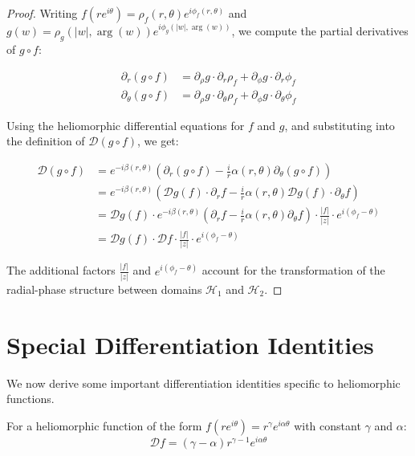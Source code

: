\begin{proof}
Writing $f(re^{i\theta}) = \rho_f(r,\theta)e^{i\phi_f(r,\theta)}$ and $g(w) = \rho_g(|w|,\arg(w))e^{i\phi_g(|w|,\arg(w))}$, we compute the partial derivatives of $g \circ f$:

\begin{align}
\partial_r(g \circ f) &= \partial_\rho g \cdot \partial_r\rho_f + \partial_\phi g \cdot \partial_r\phi_f\\
\partial_\theta(g \circ f) &= \partial_\rho g \cdot \partial_\theta\rho_f + \partial_\phi g \cdot \partial_\theta\phi_f
\end{align}

Using the heliomorphic differential equations for $f$ and $g$, and substituting into the definition of $\mathcal{D}(g \circ f)$, we get:

\begin{align}
\mathcal{D}(g \circ f) &= e^{-i\beta(r,\theta)}\left(\partial_r(g \circ f) - \frac{i}{r}\alpha(r,\theta)\partial_\theta(g \circ f)\right)\\
&= e^{-i\beta(r,\theta)}\left(\mathcal{D}g(f) \cdot \partial_rf - \frac{i}{r}\alpha(r,\theta)\mathcal{D}g(f) \cdot \partial_\theta f\right)\\
&= \mathcal{D}g(f) \cdot e^{-i\beta(r,\theta)}\left(\partial_rf - \frac{i}{r}\alpha(r,\theta)\partial_\theta f\right) \cdot \frac{|f|}{|z|} \cdot e^{i(\phi_f - \theta)}\\
&= \mathcal{D}g(f) \cdot \mathcal{D}f \cdot \frac{|f|}{|z|} \cdot e^{i(\phi_f - \theta)}
\end{align}

The additional factors $\frac{|f|}{|z|}$ and $e^{i(\phi_f - \theta)}$ account for the transformation of the radial-phase structure between domains $\mathcal{H}_1$ and $\mathcal{H}_2$.
\end{proof}

\section{Special Differentiation Identities}

We now derive some important differentiation identities specific to heliomorphic functions.

\begin{theorem}
For a heliomorphic function of the form $f(re^{i\theta}) = r^{\gamma}e^{i\alpha\theta}$ with constant $\gamma$ and $\alpha$:
\begin{equation}
\mathcal{D}f = \left(\gamma - \alpha\right)r^{\gamma-1}e^{i\alpha\theta}
\end{equation}
\end{theorem}

